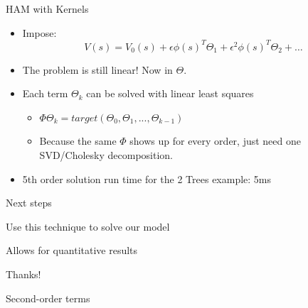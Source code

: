 \documentclass[12pt,aspectratio=169]{beamer}
\newenvironment{wideitemize}{\itemize\addtolength{\itemsep}{10pt}}{\enditemize}
\newcommand{\vspM}{\vspace{0.12truecm}}
\newenvironment{transitionframe}{
	\setbeamercolor{background canvas}{bg=mDarkBrown}
	\begin{frame}[plain, noframenumbering]}{
	\end{frame}
}
\begin{document}
  \begin{frame}{HAM with Kernels}
    \begin{itemize}
      \item Impose:
        $$
          V(s) = V_0(s) + \epsilon \phi(s)^T \Theta_1 + \epsilon^2 \phi(s)^T\Theta_2 + \ldots
        $$
      \item The problem is still linear! Now in $\Theta$.
      \item Each term $\Theta_k$ can be solved with linear least squares
        \begin{itemize}
          \item $\Phi \Theta_k = target(\Theta_0, \Theta_1, ..., \Theta_{k-1}) $
          \item Because the same $\Phi$ shows up for every order, just need one SVD/Cholesky decomposition.
        \end{itemize}
      \item 5th order solution run time for the 2 Trees example: 5ms
    \end{itemize}
  \end{frame}


\begin{frame}{Next steps}
    \begin{wideitemize}
      \item Use this technique to solve our model\vspM
      \item Allows for quantitative results
    \end{wideitemize}
  \end{frame}

\begin{frame}[standout]
        Thanks!
\end{frame}


\begin{frame}{Second-order terms}\label{second_order}
    \hyperlink{first-order}{}
\end{frame}
\end{document}
